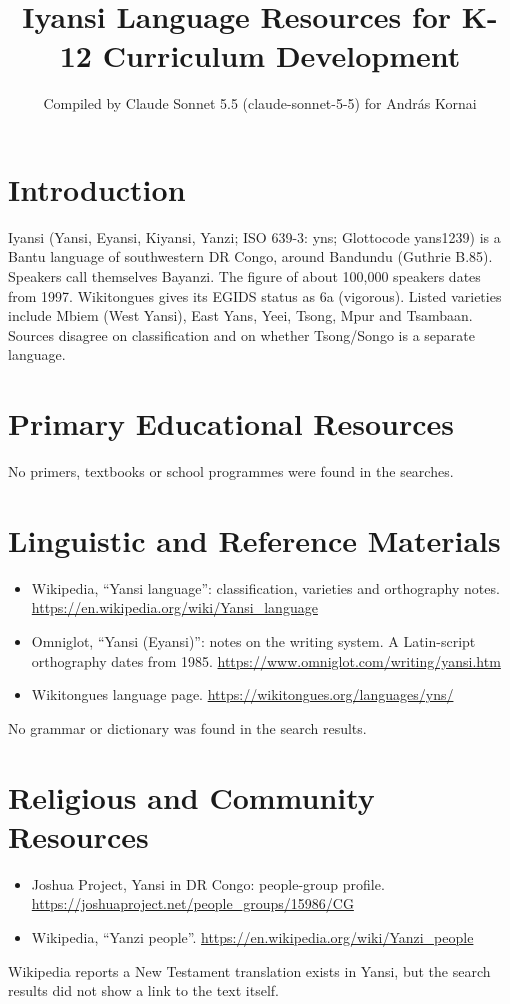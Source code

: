 \documentclass[12pt]{article}
\title{Iyansi Language Resources for K-12 Curriculum Development}
\author{Compiled by Claude Sonnet 5.5 (claude-sonnet-5-5) for Andr\'as Kornai}
\date{}
\begin{document}
\maketitle

\section{Introduction}
Iyansi (Yansi, Eyansi, Kiyansi, Yanzi; ISO 639-3: yns; Glottocode yans1239) is a Bantu language of southwestern DR Congo, around Bandundu (Guthrie B.85). Speakers call themselves Bayanzi. The figure of about 100,000 speakers dates from 1997. Wikitongues gives its EGIDS status as 6a (vigorous). Listed varieties include Mbiem (West Yansi), East Yans, Yeei, Tsong, Mpur and Tsambaan. Sources disagree on classification and on whether Tsong/Songo is a separate language.

\section{Primary Educational Resources}
No primers, textbooks or school programmes were found in the searches.

\section{Linguistic and Reference Materials}
\begin{itemize}
\item Wikipedia, ``Yansi language'': classification, varieties and orthography notes. \url{https://en.wikipedia.org/wiki/Yansi_language}
\item Omniglot, ``Yansi (Eyansi)'': notes on the writing system. A Latin-script orthography dates from 1985. \url{https://www.omniglot.com/writing/yansi.htm}
\item Wikitongues language page. \url{https://wikitongues.org/languages/yns/}
\end{itemize}
No grammar or dictionary was found in the search results.

\section{Religious and Community Resources}
\begin{itemize}
\item Joshua Project, Yansi in DR Congo: people-group profile. \url{https://joshuaproject.net/people_groups/15986/CG}
\item Wikipedia, ``Yanzi people''. \url{https://en.wikipedia.org/wiki/Yanzi_people}
\end{itemize}
Wikipedia reports a New Testament translation exists in Yansi, but the search results did not show a link to the text itself.
\end{document}
